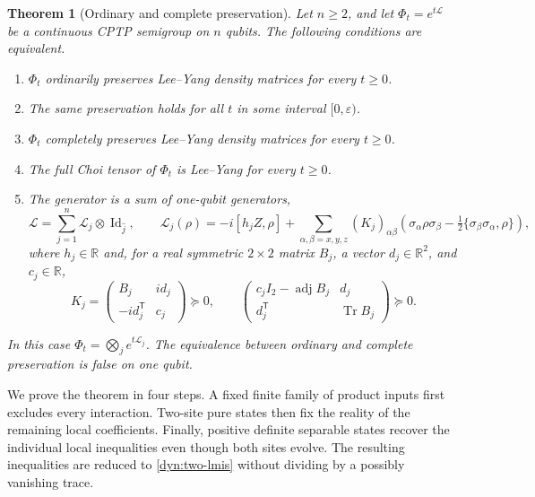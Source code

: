 \documentclass[reqno]{amsart}
\newtheorem{theorem}{Theorem}[section]
\theoremstyle{definition}
\theoremstyle{remark}
\newcommand{\R}{\mathbb R}
\DeclareMathOperator{\Tr}{Tr}
\DeclareMathOperator{\Id}{Id}
\begin{document}
\begin{theorem}[Ordinary and complete preservation]\label{dyn:main}
Let $n\ge2$, and let $\Phi_t=e^{t\mathcal L}$ be a continuous CPTP semigroup
on $n$ qubits.  The following conditions are equivalent.
\begin{enumerate}
\item $\Phi_t$ ordinarily preserves Lee--Yang density matrices for every $t\ge0$.
\item The same preservation holds for all $t$ in some interval $[0,\varepsilon)$.
\item $\Phi_t$ completely preserves Lee--Yang density matrices for every $t\ge0$.
\item The full Choi tensor of $\Phi_t$ is Lee--Yang for every $t\ge0$.
\item The generator is a sum of one-qubit generators,
\begin{equation}\label{dyn:local-form}
 \mathcal L=\sum_{j=1}^n\mathcal L_j\otimes\Id_{\widehat j},\qquad
 \mathcal L_j(\rho)=-i[h_jZ,\rho]
 +\sum_{\alpha,\beta=x,y,z}(K_j)_{\alpha\beta}
 \left(\sigma_\alpha\rho\sigma_\beta-
 \tfrac12\{\sigma_\beta\sigma_\alpha,\rho\}\right),
\end{equation}
where $h_j\in\R$ and, for a real symmetric $2\times2$ matrix $B_j$, a vector
$d_j\in\R^2$, and $c_j\in\R$,
\begin{equation}\label{dyn:two-lmis}
 K_j=\begin{pmatrix}B_j&i d_j\\-i d_j^{\mathsf T}&c_j\end{pmatrix}\succeq0,
 \qquad
 \begin{pmatrix}
 c_jI_2-\operatorname{adj}B_j&d_j\\
 d_j^{\mathsf T}&\Tr B_j
 \end{pmatrix}\succeq0.
\end{equation}
\end{enumerate}
In this case $\Phi_t=\bigotimes_j e^{t\mathcal L_j}$.  The equivalence between
ordinary and complete preservation is false on one qubit.
\end{theorem}

We prove the theorem in four steps.  A fixed finite family of product inputs
first excludes every interaction.  Two-site pure states then fix the reality
of the remaining local coefficients.  Finally, positive definite separable
states recover the individual local inequalities even though both sites
evolve.  The resulting inequalities are reduced to
\eqref{dyn:two-lmis} without dividing by a possibly vanishing trace.
\end{document}

